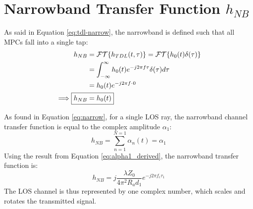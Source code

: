 \section{Narrowband Transfer Function $h_{NB}$}
As said in Equation \eqref{eq:tdl-narrow}, the narrowband is defined such that all MPCs fall into a single tap:
\begin{align}
	h_{NB} &= \mathcal{FT}\{ h_{TDL}(t, \tau)\} = \mathcal{FT}\{ h_{0}(t)\delta(\tau)\} \\
	&= \int_{-\infty}^{\infty} h_0(t) e^{-j2\pi f \tau} \delta(\tau) d\tau \\
	&=h_0(t)e^{-j2\pi f \cdot \hspace{0.05em} 0} \\
	\implies \Aboxed{h_{NB} &= h_0(t)}
\end{align}

As found in Equation \eqref{eq:narrow}, for a single LOS ray, the narrowband channel transfer function is equal to the complex amplitude $\alpha_1$:
\begin{equation}
	h_{NB} = \sum_{n=1}^{N=1} \alpha_n(t) = \alpha_1
\end{equation}
Using the result from Equation \eqref{eq:alpha1_derived}, the narrowband transfer function is:
\begin{equation}
	\boxed{h_{NB} = j \frac{\lambda Z_0}{4\pi^2 R_a d_1} e^{-j2\pi f_c \tau_1}}
	\label{eq:los_narrowband_tf_detailed}
\end{equation}
The LOS channel is thus represented by one complex number, which scales and rotates the transmitted signal.

